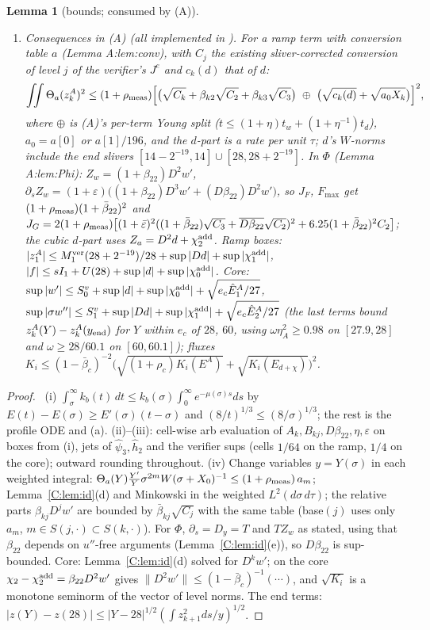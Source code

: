 \documentclass[11pt]{article}
\newtheorem{lemma}{Lemma}
\theoremstyle{remark}\newtheorem{remark}{Remark}
\newcommand{\fn}[1]{\texttt{\detokenize{#1}}}
\begin{document}
\begin{lemma}[bounds; consumed by (A)]
\begin{enumerate}
\item[(iv)] \emph{Consequences in (A)} (all implemented in \fn{t2_A_v35/rigor/assembly_rep.py --chart}). For a ramp term with conversion table $a$ (Lemma A:lem:conv), with $C_j$ the existing sliver-corrected conversion of level $j$ of the verifier's $J^e$ and $c_k(d)$ that of $d$:
\[
\iint\Theta_a(z^A_k)^2\le(1+\rho_{\rm meas})\Bigl[\bigl(\sqrt{C_k}+\beta_{k2}\sqrt{C_2}+\beta_{k3}\sqrt{C_3}\bigr)\ \oplus\ \bigl(\sqrt{c_k(d)}+\sqrt{a_0X_k}\bigr)\Bigr]^2 ,
\]
where $\oplus$ is (A)'s per-term Young split ($t\le(1+\eta)t_w+(1+\eta^{-1})t_d$), $a_0=a[0]$ or $a[1]/196$, and the $d$-part is a rate per unit $\tau$; $d$'s $W$-norms include the end slivers $[14-2^{-19},14]\cup[28,28+2^{-19}]$. In $\Phi$ (Lemma A:lem:Phi): $Z_w=(1+\beta_{22})D^2w'$, $\partial_sZ_w=(1+\varepsilon)\bigl((1+\beta_{22})D^3w'+(D\beta_{22})D^2w'\bigr)$, so $J_F$, $F_{\max}$ get $(1+\rho_{\rm meas})(1+\bar\beta_{22})^2$ and $J_G=2(1+\rho_{\rm meas})\bigl[(1+\bar\varepsilon)^2((1+\bar\beta_{22})\sqrt{C_3}+\overline{D\beta_{22}}\sqrt{C_2})^2+6.25(1+\bar\beta_{22})^2C_2\bigr]$; the cubic $d$-part uses $Z_a=D^2d+\chi^{\rm add}_2$. Ramp boxes: $|z^A_1|\le M_1^{\rm ver}(28+2^{-19})/28+\sup|Dd|+\sup|\chi^{\rm add}_1|$, $|f|\le sI_1+U(28)+\sup|d|+\sup|\chi^{\rm add}_0|$. Core: $\sup|w'|\le S^v_0+\sup|d|+\sup|\chi^{\rm add}_0|+\sqrt{e_c\hat E^A_1/27}$, $\sup|\sigma w''|\le S^v_1+\sup|Dd|+\sup|\chi^{\rm add}_1|+\sqrt{e_c\hat E^A_2/27}$ (the last terms bound $z^A_k(Y)-z^A_k(y_{\rm end})$ for $Y$ within $e_c$ of $28$, $60$, using $\omega\eta_A^2\ge0.98$ on $[27.9,28]$ and $\omega\ge28/60.1$ on $[60,60.1]$); fluxes $K_i\le(1-\bar\beta_c)^{-2}\bigl(\sqrt{(1+\rho_c)K_i(E^A)}+\sqrt{K_i(E_{d+\chi})}\bigr)^2$.
\end{enumerate}
\end{lemma}

\begin{proof}\tP\ (i) $\int_\sigma^\infty k_b(t)\,dt\le k_b(\sigma)\int_0^\infty e^{-\mu(\sigma)s}ds$ by $E(t)-E(\sigma)\ge E'(\sigma)(t-\sigma)$ and $(8/t)^{1/3}\le(8/\sigma)^{1/3}$; the rest is the profile ODE and (a). (ii)--(iii): cell-wise arb evaluation of $A_k,B_{kj},D\beta_{22},\eta,\varepsilon$ on boxes from (i), \fn{c4fun} jets of $\hat\psi_3,\hat h_2$ and the verifier sups (cells $1/64$ on the ramp, $1/4$ on the core); outward rounding throughout. (iv) Change variables $y=Y(\sigma)$ in each weighted integral: $\Theta_a(Y)\frac{Y'}{Y}\sigma^{2m}W(\sigma+X_0)^{-1}\le(1+\rho_{\rm meas})\,a_m$; Lemma~\ref{C:lem:id}(d) and Minkowski in the weighted $L^2(d\sigma\,d\tau)$; the relative parts $\beta_{kj}D^jw'$ are bounded by $\bar\beta_{kj}\sqrt{C_j}$ with the same table (base$(j)$ uses only $a_m$, $m\in S(j,\cdot)\subset S(k,\cdot)$). For $\Phi$, $\partial_s=D_y=T$ and $T Z_w$ as stated, using that $\beta_{22}$ depends on $u''$-free arguments (Lemma~\ref{C:lem:id}(e)), so $D\beta_{22}$ is sup-bounded. Core: Lemma~\ref{C:lem:id}(d) solved for $D^kw'$; on the core $\chi_2-\chi_2^{\rm add}=\beta_{22}D^2w'$ gives $\|D^2w'\|\le(1-\bar\beta_c)^{-1}(\cdots)$, and $\sqrt{K_i}$ is a monotone seminorm of the vector of level norms. The end terms: $|z(Y)-z(28)|\le|Y-28|^{1/2}(\int z_{k+1}^2ds/y)^{1/2}$.
\end{proof}
\end{document}
